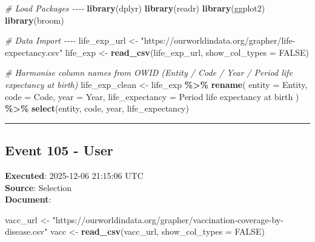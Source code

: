 \documentclass[
  11pt,
]{article}
\newenvironment{Shaded}{\begin{snugshade}}{\end{snugshade}}
\newcommand{\AttributeTok}[1]{\textcolor[rgb]{0.13,0.29,0.53}{#1}}
\newcommand{\CommentTok}[1]{\textcolor[rgb]{0.56,0.35,0.01}{\textit{#1}}}
\newcommand{\ConstantTok}[1]{\textcolor[rgb]{0.56,0.35,0.01}{#1}}
\newcommand{\FunctionTok}[1]{\textcolor[rgb]{0.13,0.29,0.53}{\textbf{#1}}}
\newcommand{\NormalTok}[1]{#1}
\newcommand{\OtherTok}[1]{\textcolor[rgb]{0.56,0.35,0.01}{#1}}
\newcommand{\SpecialCharTok}[1]{\textcolor[rgb]{0.81,0.36,0.00}{\textbf{#1}}}
\newcommand{\StringTok}[1]{\textcolor[rgb]{0.31,0.60,0.02}{#1}}
\begin{document}
\begin{Shaded}
\begin{Highlighting}[]
\CommentTok{\# Load Packages {-}{-}{-}{-}}
\FunctionTok{library}\NormalTok{(dplyr)}
\FunctionTok{library}\NormalTok{(readr)}
\FunctionTok{library}\NormalTok{(ggplot2)}
\FunctionTok{library}\NormalTok{(broom)}

\CommentTok{\# Data Import {-}{-}{-}{-}}
\NormalTok{life\_exp\_url }\OtherTok{\textless{}{-}} \StringTok{"https://ourworldindata.org/grapher/life{-}expectancy.csv"}
\NormalTok{life\_exp }\OtherTok{\textless{}{-}} \FunctionTok{read\_csv}\NormalTok{(life\_exp\_url, }\AttributeTok{show\_col\_types =} \ConstantTok{FALSE}\NormalTok{)}

\CommentTok{\# Harmonise column names from OWID (Entity / Code / Year / Period life expectancy at birth)}
\NormalTok{life\_exp\_clean }\OtherTok{\textless{}{-}}\NormalTok{ life\_exp }\SpecialCharTok{\%\textgreater{}\%}
  \FunctionTok{rename}\NormalTok{(}
    \AttributeTok{entity =}\NormalTok{ Entity,}
    \AttributeTok{code =}\NormalTok{ Code,}
    \AttributeTok{year =}\NormalTok{ Year,}
    \AttributeTok{life\_expectancy =} \StringTok{\textasciigrave{}}\AttributeTok{Period life expectancy at birth}\StringTok{\textasciigrave{}}
\NormalTok{  ) }\SpecialCharTok{\%\textgreater{}\%}
  \FunctionTok{select}\NormalTok{(entity, code, year, life\_expectancy)}
\end{Highlighting}
\end{Shaded}

\begin{center}\rule{0.5\linewidth}{0.5pt}\end{center}

\subsection{Event 105 - User}\label{event-105---user}

\textbf{Executed}: 2025-12-06 21:15:06 UTC\\
\textbf{Source}: Selection\\
\textbf{Document}:

\begin{Shaded}
\begin{Highlighting}[]
\NormalTok{vacc\_url }\OtherTok{\textless{}{-}} \StringTok{"https://ourworldindata.org/grapher/vaccination{-}coverage{-}by{-}disease.csv"}
\NormalTok{vacc }\OtherTok{\textless{}{-}} \FunctionTok{read\_csv}\NormalTok{(vacc\_url, }\AttributeTok{show\_col\_types =} \ConstantTok{FALSE}\NormalTok{)}
\end{Highlighting}
\end{Shaded}
\end{document}
